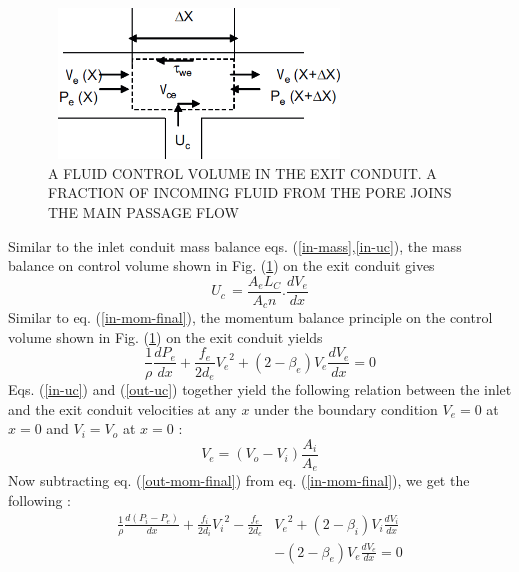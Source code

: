 \documentclass[twocolumn,10pt,cleanfoot]{ihmtc}
\begin{document}
%
\begin{figure}[ht]
\centerline{\includegraphics[width=80mm,height=40mm,scale=0.50]{exitcon.PNG}}
\vspace{-1.5ex}
\caption{\small{A FLUID CONTROL VOLUME IN THE EXIT CONDUIT. A FRACTION OF INCOMING FLUID FROM THE PORE JOINS THE MAIN PASSAGE FLOW}}
\label{exitcon}
\vspace{-3em}
\end{figure}
%
Similar to the inlet conduit mass balance eqs. (\ref{in-mass},\ref{in-uc}), the mass balance on control volume shown in Fig. (\ref{exitcon}) on the exit conduit gives
%
\begin{equation} \label{out-uc}
{{U}_{c}}\,=\frac{{{A}_{e}}L_C}{{{A}_{c}}n}.\frac{d{{V}_{e}}}{dx}
\end{equation}
%
Similar to eq. (\ref{in-mom-final}), the momentum balance principle on the control volume shown in Fig. (\ref{exitcon}) on the exit conduit yields
%
\begin{equation} \label{out-mom-final}
\frac{1}{\rho }\frac{d{{P}_{e}}}{dx}+\frac{{{f}_{e}}}{2{{d}_{e}}}{{V}_{e}}^{2}+(2-{{\beta }_{e}}){{V}_{e}}\frac{d{{V}_{e}}}{dx}=0
\end{equation}
%
Eqs. (\ref{in-uc}) and (\ref{out-uc}) together yield the following
relation between the inlet and the exit conduit velocities at any
$x$ under the boundary condition $V_e=0$ at $x=0$ and $V_i=V_o$ at $x=0$ :
%
\begin{equation} \label{vel-relation}
{{V}_{e}}=\left( {{V}_{o}}-{{V}_{i}} \right)\frac{{{A}_{i}}}{{{A}_{e}}}
\end{equation}
%
Now subtracting eq. (\ref{out-mom-final}) from eq. (\ref{in-mom-final}),
we get the following : 
%
\begin{equation} \label{combined-mom}
\begin{split}
\frac{1}{\rho}\frac{d({{P}_{i}}-{{P}_{e}})}{dx}+\frac{{f}_{i}}{2{{d}_{i}}}{{V}_{i}}^{2}-\frac{{f}_{e}}{2{{d}_{e}}} & {{V}_{e}}^{2} +(2-{\beta}_{i}){V}_{i}\frac{d{{V}_{i}}}{dx}\\ 
& - (2-{\beta }_{e}){V}_{e}\frac{d{{V}_{e}}}{dx}=0
\end{split}
\end{equation}
\end{document}
